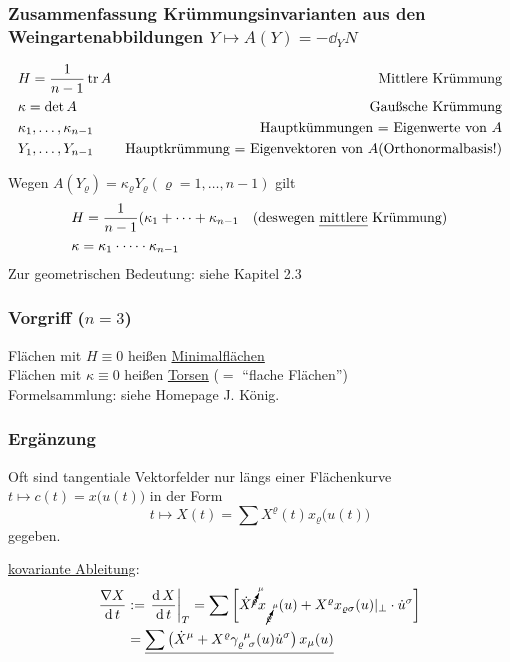 \subsubsection{Zusammenfassung Krümmungsinvarianten aus den Weingartenabbildungen \(Y \mapsto A(Y) = -\dd_Y N\)}
\begin{align*}
 &H = \frac{1}{n-1} \operatorname{tr} A & \text{Mittlere Krümmung} \\
 &\kappa = \det A & \text{Gaußsche Krümmung} \\
 &\kappa_1, \dots, \kappa_{n-1} & \text{Hauptkümmungen = Eigenwerte von }A \\
 &Y_1, \dots, Y_{n-1} & \text{Hauptkrümmung = Eigenvektoren von }A \text{(Orthonormalbasis!)}
\end{align*}

\begin{folgerung}
 Wegen \(A(Y_\varrho) = \kappa_\varrho Y_\varrho (\varrho = 1, \dots, n-1)\) gilt
 \begin{align*}
  &H = \frac{1}{n-1} (\kappa_1 + \dots + \kappa_{n-1} & \text{(deswegen \uline{mittlere} Krümmung)} \\
  & \kappa = \kappa_1 \cdot \dots \cdot \kappa_{n-1}
 \end{align*}
Zur geometrischen Bedeutung: siehe Kapitel 2.3
\end{folgerung}

\subsubsection{Vorgriff ($n=3$)}
Flächen mit \(H \equiv 0\) heißen \uline{Minimalflächen} \\
Flächen mit \(\kappa \equiv 0\) heißen \uline{Torsen} (\(=\) "`flache Flächen"') \\
Formelsammlung: siehe Homepage J. König.
\subsubsection{Ergänzung}
Oft sind tangentiale Vektorfelder nur längs einer Flächenkurve \(t \mapsto c(t) = x\big(u(t)\big)\) in der Form 
\[
 t \mapsto X(t) = \sum X^\varrho(t)x_{\varrho}\big(u(t)\big)
\]
gegeben.
\begin{bsp}
  \uline{kovariante Ableitung}:
  \begin{align*}
   \frac{\nabla X}{\dd t} &:= \left.\frac{\dd X}{\dd t} \right|_T = \sum \left[\dot X^{\cancelto{\mu}{\varrho}} x_{\cancelto{\mu}\varrho} \;\,(u) + X^\varrho x_{\varrho \sigma} (u)|_\perp \cdot \dot u^\sigma\right] \\
   &= \uline{\sum \left( \dot X^\mu + X^\varrho \christ \varrho \mu \sigma (u) \dot u^\sigma \right) x_\mu(u)}
  \end{align*}
\end{bsp}

